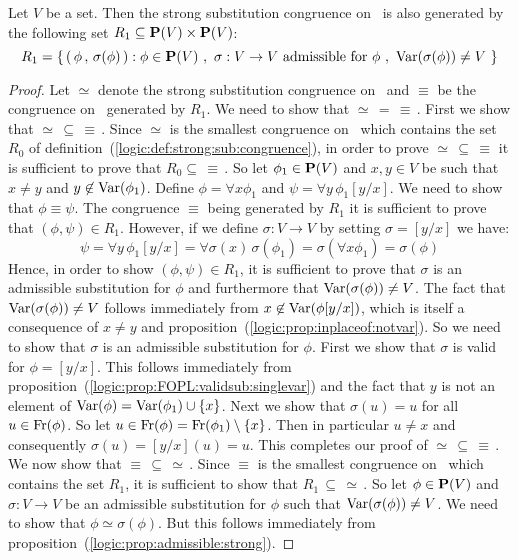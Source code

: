 \begin{prop}\label{logic:prop:strong:quant:congruence:from:admissible}
Let $V$ be a set. Then the strong substitution congruence on \pv\ is
also generated by the following set $R_{1}\subseteq \mbox{${\bf P}(V)$}\times\mbox{${\bf P}(V)$}$:
    \[
    R_{1}=\left\{\,(\,\phi\,,\,\sigma(\phi)\,):\phi\in\pv\ ,\
    \mbox{$\sigma:V\to V$ admissible for $\phi$}\ ,\
    \var(\sigma(\phi))\neq V\ \right\}
    \]
\end{prop}
\begin{proof}
Let $\simeq$ denote the strong substitution congruence on \pv\ and
$\equiv$ be the congruence on \pv\ generated by $R_{1}$. We need to
show that $\simeq\,=\,\equiv\,$. First we show that
$\simeq\,\subseteq\,\equiv\,$. Since $\simeq$ is the smallest
congruence on \pv\ which contains the set $R_{0}$ of
definition~(\ref{logic:def:strong:sub:congruence}), in order to
prove $\simeq\,\subseteq\,\equiv$ it is sufficient to prove that
$R_{0}\subseteq\,\equiv\,$. So let $\phi_{1}\in\mbox{${\bf P}(V)$}$ and $x,y\in V$
be such that $x\neq y$ and $y\not\in\mbox{\rm Var}(\phi_{1})$. Define
$\phi=\forall x\phi_{1}$ and $\psi=\forall y\,\phi_{1}[y/x]$. We
need to show that $\phi\equiv\psi$. The congruence $\equiv$ being
generated by $R_{1}$ it is sufficient to prove that $(\phi,\psi)\in
R_{1}$. However, if we define $\sigma:V\to V$ by setting
$\sigma=[y/x]$ we have:
    \[
    \psi=\forall
    y\,\phi_{1}[y/x]=\forall\sigma(x)\,\sigma(\phi_{1})=\sigma(\forall
    x\phi_{1})=\sigma(\phi)
    \]
Hence, in order to show $(\phi,\psi)\in R_{1}$, it is sufficient to
prove that $\sigma$ is an admissible substitution for $\phi$ and
furthermore that $\mbox{\rm Var}(\sigma(\phi))\neq V$. The fact that
$\mbox{\rm Var}(\sigma(\phi))\neq V$ follows immediately from
$x\not\in\mbox{\rm Var}(\phi[y/x])$, which is itself a consequence of $x\neq
y$ and proposition~(\ref{logic:prop:inplaceof:notvar}). So we need
to show that $\sigma$ is an admissible substitution for $\phi$.
First we show that $\sigma$ is valid for $\phi=[y/x]$. This follows
immediately from
proposition~(\ref{logic:prop:FOPL:validsub:singlevar}) and the fact
that $y$ is not an element of $\mbox{\rm Var}(\phi)=\mbox{\rm Var}(\phi_{1})\cup\{x\}$.
Next we show that $\sigma(u)=u$ for all $u\in\mbox{\rm Fr}(\phi)$. So let
$u\in\mbox{\rm Fr}(\phi)=\mbox{\rm Fr}(\phi_{1})\setminus\{x\}$. Then in particular
$u\neq x$ and consequently $\sigma(u)=[y/x](u)=u$. This completes
our proof of $\simeq\,\subseteq\,\equiv\,$. We now show that
$\equiv\,\subseteq\,\simeq\,$. Since $\equiv$ is the smallest
congruence on \pv\ which contains the set $R_{1}$, it is sufficient
to show that $R_{1}\,\subseteq\,\simeq\,$. So let $\phi\in\mbox{${\bf P}(V)$}$ and
$\sigma:V\to V$ be an admissible substitution for $\phi$ such that
$\mbox{\rm Var}(\sigma(\phi))\neq V$. We need to show that
$\phi\simeq\sigma(\phi)$. But this follows immediately from
proposition~(\ref{logic:prop:admissible:strong}).
\end{proof}

